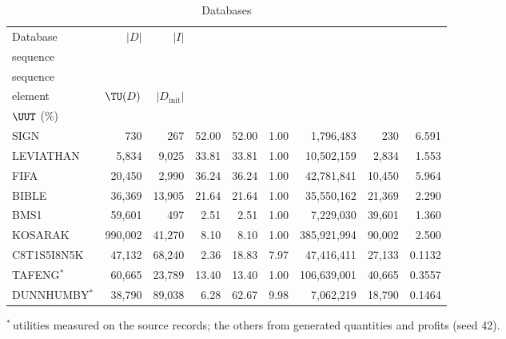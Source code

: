 \begin{table}[!htbp]\centering
\setlength{\tabcolsep}{3pt}
\caption{Databases}\label{tab:datasets}
\begin{tabular*}{\textwidth}{@{\extracolsep\fill}lrrrrrrrr@{}}\toprule
Database & $|D|$ & $|I|$ & \begin{tabular}[b]{@{}r@{}}Elements/\\sequence\end{tabular} & \begin{tabular}[b]{@{}r@{}}Items/\\sequence\end{tabular} & \begin{tabular}[b]{@{}r@{}}Items/\\element\end{tabular} & $\TU(D)$ & $|D_{\mathrm{init}}|$ & \begin{tabular}[b]{@{}r@{}}Default\\$\UUT$ (\%)\end{tabular} \\\midrule
SIGN & 730 & 267 & 52.00 & 52.00 & 1.00 & 1,796,483 & 230 & 6.591 \\
LEVIATHAN & 5,834 & 9,025 & 33.81 & 33.81 & 1.00 & 10,502,159 & 2,834 & 1.553 \\
FIFA & 20,450 & 2,990 & 36.24 & 36.24 & 1.00 & 42,781,841 & 10,450 & 5.964 \\
BIBLE & 36,369 & 13,905 & 21.64 & 21.64 & 1.00 & 35,550,162 & 21,369 & 2.290 \\
BMS1 & 59,601 & 497 & 2.51 & 2.51 & 1.00 & 7,229,030 & 39,601 & 1.360 \\
KOSARAK & 990,002 & 41,270 & 8.10 & 8.10 & 1.00 & 385,921,994 & 90,002 & 2.500 \\
C8T1S5I8N5K & 47,132 & 68,240 & 2.36 & 18.83 & 7.97 & 47,416,411 & 27,133 & 0.1132 \\
TAFENG$^{\ast}$ & 60,665 & 23,789 & 13.40 & 13.40 & 1.00 & 106,639,001 & 40,665 & 0.3557 \\
DUNNHUMBY$^{\ast}$ & 38,790 & 89,038 & 6.28 & 62.67 & 9.98 & 7,062,219 & 18,790 & 0.1464 \\\bottomrule
\end{tabular*}
\par\smallskip $^{\ast}$\,utilities measured on the source records; the others from generated quantities and profits (seed 42).
\end{table}
